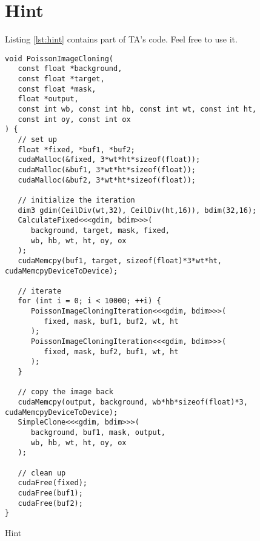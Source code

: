 \documentclass[12pt,a4paper]{article}
\newcommand{\lstref}[1]{Listing \ref{lst:#1}}
\begin{document}
\section{Hint}
\lstref{hint} contains part of TA's code. Feel free to use it.

\pagebreak

\begin{listing}
\begin{verbatim}
void PoissonImageCloning(
   const float *background,
   const float *target,
   const float *mask,
   float *output,
   const int wb, const int hb, const int wt, const int ht,
   const int oy, const int ox
) {
   // set up
   float *fixed, *buf1, *buf2;
   cudaMalloc(&fixed, 3*wt*ht*sizeof(float));
   cudaMalloc(&buf1, 3*wt*ht*sizeof(float));
   cudaMalloc(&buf2, 3*wt*ht*sizeof(float));

   // initialize the iteration
   dim3 gdim(CeilDiv(wt,32), CeilDiv(ht,16)), bdim(32,16);
   CalculateFixed<<<gdim, bdim>>>(
      background, target, mask, fixed,
      wb, hb, wt, ht, oy, ox
   );
   cudaMemcpy(buf1, target, sizeof(float)*3*wt*ht, cudaMemcpyDeviceToDevice);

   // iterate
   for (int i = 0; i < 10000; ++i) {
      PoissonImageCloningIteration<<<gdim, bdim>>>(
         fixed, mask, buf1, buf2, wt, ht
      );
      PoissonImageCloningIteration<<<gdim, bdim>>>(
         fixed, mask, buf2, buf1, wt, ht
      );
   }

   // copy the image back
   cudaMemcpy(output, background, wb*hb*sizeof(float)*3, cudaMemcpyDeviceToDevice);
   SimpleClone<<<gdim, bdim>>>(
      background, buf1, mask, output,
      wb, hb, wt, ht, oy, ox
   );

   // clean up
   cudaFree(fixed);
   cudaFree(buf1);
   cudaFree(buf2);
}
\end{verbatim}
\caption{Hint}\label{lst:hint}
\end{listing}
\end{document}
